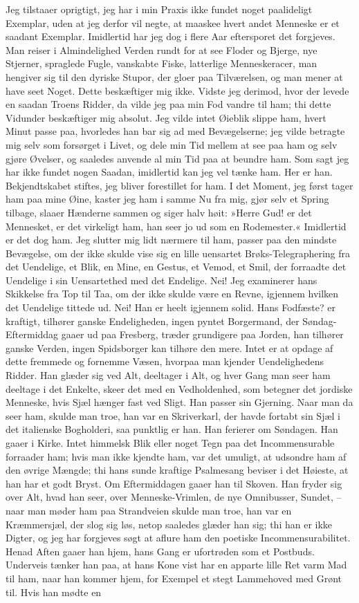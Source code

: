 \documentclass[12pt,a4paper]{article}
\begin{document}
Jeg tilstaaer oprigtigt, jeg har i min Praxis ikke fundet noget paalideligt Exemplar, uden at jeg derfor vil negte, at maaskee hvert andet Menneske er et saadant Exemplar. Imidlertid har jeg dog i flere Aar eftersporet det forgjeves. Man reiser i Almindelighed Verden rundt for at see Floder og Bjerge, nye Stjerner, spraglede Fugle, vanskabte Fiske, latterlige Menneskeracer, man hengiver sig til den dyriske Stupor, der gloer paa Tilværelsen, og man mener at have seet Noget. Dette beskæftiger mig ikke. Vidste jeg derimod, hvor der levede en saadan Troens Ridder, da vilde jeg paa min Fod vandre til ham; thi dette Vidunder beskæftiger mig absolut. Jeg vilde intet Øieblik slippe ham, hvert Minut passe paa, hvorledes han bar sig ad med Bevægelserne; jeg vilde betragte mig selv som forsørget i Livet, og dele min Tid mellem at see paa ham og selv gjøre Øvelser, og saaledes anvende al min Tid paa at beundre ham. Som sagt jeg har ikke fundet nogen Saadan, imidlertid kan jeg vel tænke ham. Her er han. Bekjendtskabet stiftes, jeg bliver forestillet for ham. I det Moment, jeg først tager ham paa mine Øine, kaster jeg ham i samme Nu fra mig, gjør selv et Spring tilbage, slaaer Hænderne sammen og siger halv høit: »Herre Gud! er det Mennesket, er det virkeligt ham, han seer jo ud som en Rodemester.« Imidlertid er det dog ham. Jeg slutter mig lidt nærmere til ham, passer paa den mindste Bevægelse, om der ikke skulde vise sig en lille uensartet Brøks-Telegraphering fra det Uendelige, et Blik, en Mine, en Gestus, et Vemod, et Smil, der forraadte det Uendelige i sin Uensartethed med det Endelige. Nei! Jeg examinerer hans Skikkelse fra Top til Taa, om der ikke skulde være en Revne, igjennem hvilken det Uendelige tittede ud. Nei! Han er heelt igjennem solid. Hans Fodfæste? er kraftigt, tilhører ganske Endeligheden, ingen pyntet Borgermand, der Søndag-Eftermiddag gaaer ud paa Fresberg, træder grundigere paa Jorden, han tilhører ganske Verden, ingen Spidsborger kan tilhøre den mere. Intet er at opdage af dette fremmede og fornemme Væsen, hvorpaa man kjender Uendelighedens Ridder. Han glæder sig ved Alt, deeltager i Alt, og hver Gang man seer ham deeltage i det Enkelte, skeer det med en Vedholdenhed, som betegner det jordiske Menneske, hvis Sjæl hænger fast ved Sligt. Han passer sin Gjerning. Naar man da seer ham, skulde man troe, han var en Skriverkarl, der havde fortabt sin Sjæl i det italienske Bogholderi, saa punktlig er han. Han ferierer om Søndagen. Han gaaer i Kirke. Intet himmelsk Blik eller noget Tegn paa det Incommensurable forraader ham; hvis man ikke kjendte ham, var det umuligt, at udsondre ham af den øvrige Mængde; thi hans sunde kraftige Psalmesang beviser i det Høieste, at han har et godt Bryst. Om Eftermiddagen gaaer han til Skoven. Han fryder sig over Alt, hvad han seer, over Menneske-Vrimlen, de nye Omnibusser, Sundet, – naar man møder ham paa Strandveien skulde man troe, han var en Kræmmersjæl, der slog sig løs, netop saaledes glæder han sig; thi han er ikke Digter, og jeg har forgjeves søgt at aflure ham den poetiske Incommensurabilitet. Henad Aften gaaer han hjem, hans Gang er ufortrøden som et Postbuds. Underveis tænker han paa, at hans Kone vist har en apparte lille Ret varm Mad til ham, naar han kommer hjem, for Exempel et stegt Lammehoved med Grønt til. Hvis han mødte en 
\end{document}
